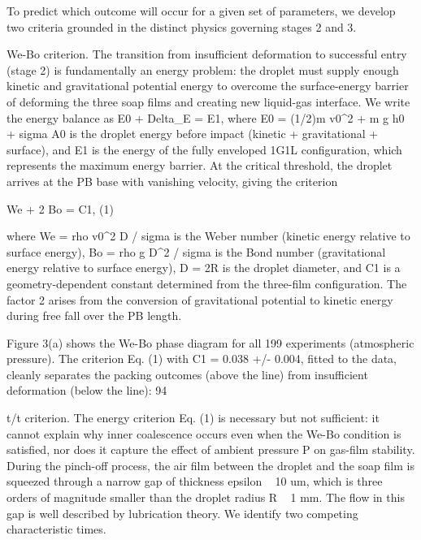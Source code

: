 To predict which outcome will occur for a given set of parameters, we develop two criteria grounded in the distinct physics governing stages 2 and 3.

We-Bo criterion. The transition from insufficient deformation to successful entry (stage 2) is fundamentally an energy problem: the droplet must supply enough kinetic and gravitational potential energy to overcome the surface-energy barrier of deforming the three soap films and creating new liquid-gas interface. We write the energy balance as E0 + Delta_E = E1, where E0 = (1/2)m v0^2 + m g h0 + sigma A0 is the droplet energy before impact (kinetic + gravitational + surface), and E1 is the energy of the fully enveloped 1G1L configuration, which represents the maximum energy barrier. At the critical threshold, the droplet arrives at the PB base with vanishing velocity, giving the criterion

  We + 2 Bo = C1,                                            (1)

where We = rho v0^2 D / sigma is the Weber number (kinetic energy relative to surface energy), Bo = rho g D^2 / sigma is the Bond number (gravitational energy relative to surface energy), D = 2R is the droplet diameter, and C1 is a geometry-dependent constant determined from the three-film configuration. The factor 2 arises from the conversion of gravitational potential to kinetic energy during free fall over the PB length.

Figure 3(a) shows the We-Bo phase diagram for all 199 experiments (atmospheric pressure). The criterion Eq. (1) with C1 = 0.038 +/- 0.004, fitted to the data, cleanly separates the packing outcomes (above the line) from insufficient deformation (below the line): 94%

t/t criterion. The energy criterion Eq. (1) is necessary but not sufficient: it cannot explain why inner coalescence occurs even when the We-Bo condition is satisfied, nor does it capture the effect of ambient pressure P on gas-film stability. During the pinch-off process, the air film between the droplet and the soap film is squeezed through a narrow gap of thickness epsilon ~ 10 um, which is three orders of magnitude smaller than the droplet radius R ~ 1 mm. The flow in this gap is well described by lubrication theory. We identify two competing characteristic times.

